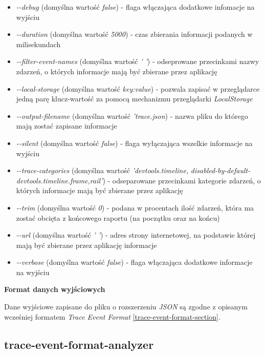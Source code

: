 \documentclass[polish, twoside, 12pt]{mwart}
\begin{document}
\begin{itemize}
  \item \emph{-{}-debug} (domyślna wartość \emph{false}) - flaga włączająca dodatkowe infomacje na wyjściu
  \item \emph{-{}-duration} (domyślna wartość \emph{5000}) - czas zbierania informacji podanych w milisekundach
  \item \emph{-{}-filter-event-names} (domyślna wartość \emph{' '}) - odseprowane przecinkami nazwy zdarzeń, o których informacje mają być zbierane przez aplikację
  \item \emph{-{}-local-storage} (domyślna wartość \emph{key:value}) - pozwala zapisać w przeglądarce jedną parę klucz-wartość za pomocą mechanizmu przeglądarki \emph{LocalStorage}
  \item \emph{-{}-output-filename} (domyślna wartość \emph{'trace.json}) - nazwa pliku do którego mają zostać zapisane informacje
  \item \emph{-{}-silent} (domyślna wartość \emph{false}) - flaga wyłączająca wszelkie informacje na wyjściu
  \item \emph{-{}-trace-categories} (domyślna wartość \emph{'devtools.timeline,} \newline \emph{disabled-by-default-devtools.timeline.frame,rail'}) - odseparowane przecinkami kategorie zdarzeń, o których informacje mają być zbierane przez aplikację
  \item \emph{-{}-trim} (domyślna wartość \emph{0}) - podana w procentach ilość zdarzeń, która ma zostać obcięta z końcowego raportu (na początku oraz na końcu)
  \item \emph{-{}-url} (domyślna wartość \emph{' '}) - adres strony internetowej, na podstawie której mają być zbierane przez aplikację informacje
  \item \emph{-{}-verbose} (domyślna wartość \emph{false}) - flaga włączająca dodatkowe informacje na wyjściu
\end{itemize}

\textbf{Format danych wyjściowych} \newline

Dane wyjściowe zapisane do pliku o rozszerzeniu \emph{JSON} są zgodne z opisanym wcześniej formatem \emph{Trace Event Format} \ref{trace-event-format-section}.

\subsection{trace-event-format-analyzer}
\end{document}
